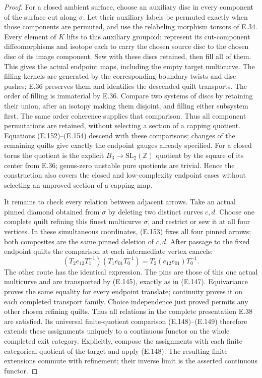 \begin{proof}
For a closed ambient surface, choose an auxiliary disc in every
component of the surface cut along $\sigma$.  Let their auxiliary
labels be permuted exactly when those components are permuted,
and use the relabeling morphism torsors of E.34.  Every element
of $K$ lifts to this auxiliary groupoid: represent its cut-component
diffeomorphisms and isotope each to carry the chosen source disc
to the chosen disc of its image component.  Sew with these discs
retained, then fill all of them.  This gives the actual endpoint
maps, including the empty target multicurve.  The filling kernels
are generated by the corresponding boundary twists and disc
pushes; E.36 preserves them and identifies the descended quilt
transports.  The order of filling is immaterial by E.36.  Compare
two systems of discs by retaining their union, after an isotopy
making them disjoint, and filling either subsystem first.  The
same order coherence supplies that comparison.  Thus all component
permutations are retained, without selecting a section of a
capping quotient.  Equations (E.152)--(E.154) descend with these
comparisons; changes of the remaining quilts give exactly the
endpoint gauges already specified.  For a closed torus the
quotient is the explicit $B_3\to\mathrm{SL}_2(\mathbb Z)$
quotient by the square of its center from E.36; genus-zero
unstable pure quotients are trivial.  Hence the construction
also covers the closed and low-complexity endpoint cases without
selecting an unproved section of a capping map.

It remains to check every relation between adjacent arrows.
Take an actual pinned diamond obtained from $\sigma$ by deleting
two distinct curves $c,d$.  Choose one complete quilt refining
this finest multicurve $\sigma$, and restrict or sew it at all
four vertices.  In these simultaneous coordinates, (E.153)
fixes all four pinned arrows; both composites are the same
pinned deletion of $c,d$.  After passage to the fixed endpoint
quilts the comparison at each intermediate vertex cancels:
\[
 (T_2e_{12}T_1^{-1})(T_1e_{01}T_0^{-1})
                 =T_2(e_{12}e_{01})T_0^{-1}.                 \tag{E.155}
\]
The other route has the identical expression.  The pins are
those of this one actual multicurve and are transported by
(E.145), exactly as in (E.147).  Equivariance proves the same
equality for every endpoint translate; continuity proves it
on each completed transport family.  Choice independence just
proved permits any other chosen refining quilts.  Thus all
relations in the complete presentation E.38 are satisfied.
Its universal finite-quotient comparison (E.148)--(E.149)
therefore extends these assignments uniquely to a continuous
functor on the whole completed exit category.  Explicitly, compose
the assignments with each finite categorical quotient of the
target and apply (E.148).  The resulting finite extensions commute
with refinement; their inverse limit is the asserted continuous
functor.


\end{proof}
